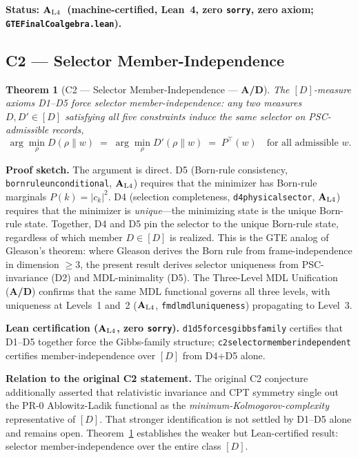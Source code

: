 \documentclass[12pt,letterpaper]{article}
\newtheorem{theorem}{Theorem}[section]
\newcommand{\catAL}{\ensuremath{\textbf{A}_{\rm L4}}}
\newcommand{\catAD}{\textbf{A/D}}
\newcommand{\CatAD}{\textbf{A/D}}
\newcommand{\lean}[1]{%
  \penalty-100
  \begingroup\def\_{\textunderscore\allowbreak}\texttt{#1}\endgroup}
\begin{document}
\noindent\textbf{Status: \catAL\ (machine-certified, Lean~4, zero \texttt{sorry},
zero axiom;\linebreak[0]\lean{GTEFinalCoalgebra\allowbreak.lean}).}

\subsection{C2 --- Selector Member-Independence}
\label{sec:C2}

\begin{theorem}[C2 --- Selector Member-Independence --- \catAD{}]
\label{thm:C2}
The $[D]$-measure axioms D1--D5 force selector member-independence: any two measures
$D, D' \in [D]$ satisfying all five constraints induce the \emph{same} selector on
PSC-admissible records,
\[
  \arg\!\min_\rho D(\rho \| w) \;=\; \arg\!\min_\rho D'(\rho \| w)
  \;=\; P^\top(w)
  \quad \text{for all admissible } w.
\]
\end{theorem}

\noindent\textbf{Proof sketch.}  The argument is direct.  D5 (Born-rule
consistency, \lean{born\_rule\_unconditional}, \catAL) requires that the minimizer
has Born-rule marginals $P(k) = |c_k|^2$.  D4 (selection completeness,
\lean{d4\_physical\_sector}, \catAL) requires that the minimizer is
\emph{unique}---the minimizing state is the unique Born-rule state.  Together, D4
and D5 pin the selector to the unique Born-rule state, regardless of which member
$D \in [D]$ is realized.  This is the GTE analog of Gleason's theorem: where
Gleason derives the Born rule from frame-independence in dimension $\geq 3$, the
present result derives selector uniqueness from PSC-invariance (D2) and
MDL-minimality (D5).  The Three-Level MDL Unification (\CatAD{}) confirms that the
same MDL functional governs all three levels, with uniqueness at Levels~1 and~2
(\catAL, \lean{fmdl\_mdl\_uniqueness}) propagating to Level~3.

\noindent\textbf{Lean certification (\catAL, zero \texttt{sorry}).}
\lean{d1\_d5\_forces\_gibbs\_family} certifies that D1--D5 together force the
Gibbs-family structure; \lean{c2\_selector\_member\_independent} certifies
member-independence over $[D]$ from D4+D5 alone.

\noindent\textbf{Relation to the original C2 statement.}  The original C2 conjecture
additionally asserted that relativistic invariance and CPT symmetry single out the
PR-0 Ablowitz-Ladik functional as the \emph{minimum-Kolmogorov-complexity}
representative of $[D]$.  That stronger identification is not settled by D1--D5
alone and remains open.  Theorem~\ref{thm:C2} establishes the weaker but Lean-certified
result: selector member-independence over the entire class $[D]$.
\end{document}
